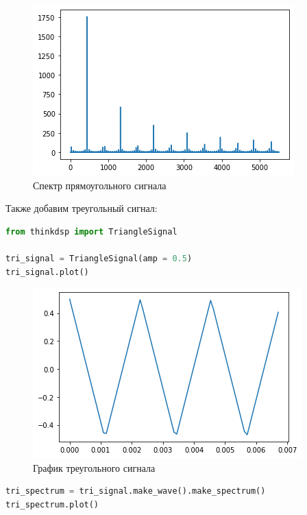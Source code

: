 \begin{figure}[H]
	\begin{center}
		\includegraphics[scale=1]{fig/lab02/lab02_10_0.png}
		\caption{Спектр прямоугольного сигнала}
	\end{center}
\end{figure}

Также добавим треугольный сигнал:

\begin{lstlisting}[language=Python]
from thinkdsp import TriangleSignal

tri_signal = TriangleSignal(amp = 0.5)
tri_signal.plot()
\end{lstlisting}

\begin{figure}[H]
	\begin{center}
		\includegraphics[scale=1]{fig/lab02/lab02_12_0.png}
		\caption{График треугольного сигнала}
	\end{center}
\end{figure}

\begin{lstlisting}[language=Python]
tri_spectrum = tri_signal.make_wave().make_spectrum()
tri_spectrum.plot()
\end{lstlisting}

